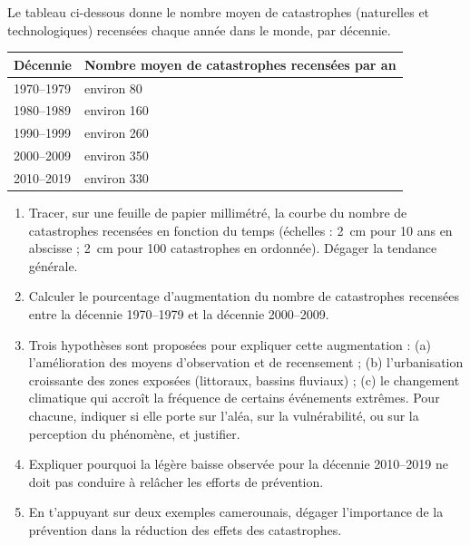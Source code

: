 \documentclass[11pt]{article}
\begin{document}
\begin{exercice}
Le tableau ci-dessous donne le nombre moyen de catastrophes (naturelles et technologiques) recensées chaque année dans le monde, par décennie.

\begin{center}
\begin{tabularx}{\linewidth}{|l|X|}\hline
\rowcolor{popblueL} Décennie & Nombre moyen de catastrophes recensées par an \\ \hline
1970--1979 & environ 80 \\ \hline
1980--1989 & environ 160 \\ \hline
1990--1999 & environ 260 \\ \hline
2000--2009 & environ 350 \\ \hline
2010--2019 & environ 330 \\ \hline
\end{tabularx}
\end{center}

\begin{enumerate}
\item Tracer, sur une feuille de papier millimétré, la courbe du nombre de catastrophes recensées en fonction du temps (échelles : \SI{2}{cm} pour 10 ans en abscisse ; \SI{2}{cm} pour 100 catastrophes en ordonnée). Dégager la tendance générale.
\item Calculer le pourcentage d'augmentation du nombre de catastrophes recensées entre la décennie 1970--1979 et la décennie 2000--2009.
\item Trois hypothèses sont proposées pour expliquer cette augmentation : (a) l'amélioration des moyens d'observation et de recensement ; (b) l'urbanisation croissante des zones exposées (littoraux, bassins fluviaux) ; (c) le changement climatique qui accroît la fréquence de certains événements extrêmes. Pour chacune, indiquer si elle porte sur l'aléa, sur la vulnérabilité, ou sur la perception du phénomène, et justifier.
\item Expliquer pourquoi la légère baisse observée pour la décennie 2010--2019 ne doit pas conduire à relâcher les efforts de prévention.
\item En t'appuyant sur deux exemples camerounais, dégager l'importance de la prévention dans la réduction des effets des catastrophes.
\end{enumerate}
\end{exercice}
\end{document}

